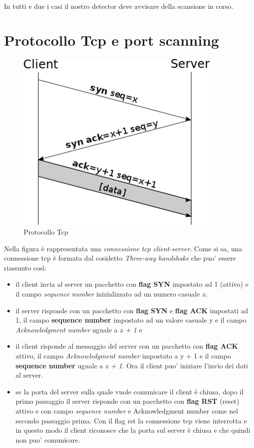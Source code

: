 \documentclass[a4paper,12pt]{article} %
\begin{document}
In tutti e due i casi il nostro detector deve avvisare della scansione in corso.




\section{Protocollo Tcp e port scanning}

\begin{figure}[htbp]
\centering
\includegraphics[width=10cm]{tcp.png}
\caption{\label{Protocollo tcp} Protocollo Tcp}
\end{figure}



Nella figura è rappresentata una \emph{connessione tcp} \emph{client-server}. Come si sa, una connessione tcp è formata dal cosidetto
\emph{Three-way handshake} che puo' essere riassunto così:

\begin{itemize}

\item il client invia al server un pacchetto con \textbf{flag SYN} impostato ad 1 (attivo) e il campo \emph{sequence number}
inizializzato ad un numero casuale \emph{x}.


\item il server risponde con un pacchetto con \textbf{flag SYN} e \textbf{flag ACK} impostati ad 1, il campo \textbf{sequence number}
impostato ad un valore casuale y e il campo \emph{Acknowledgment number} uguale a \emph{x + 1} e 

\item il client risponde al messaggio del server con un pacchetto con \textbf{flag ACK} attivo, il campo \emph{Acknowledgment number} impostato a y + 1 e il campo \textbf{sequence number} uguale a \emph{x + 1}. Ora il client puo' iniziare
l'invio dei dati al server.


\item se la porta del server sulla quale vuole comunicare il client è chiusa, dopo il primo passaggio il server risponde con un pacchetto con \textbf{flag RST} (reset) attivo e con campo \emph{sequence number} e {Acknowledgment number} come nel secondo passaggio prima. Con il flag rst la connessione tcp viene interrotta e in questo modo il client riconosce che la porta sul server è chiusa e che quindi non puo' comunicare.


\end{itemize}
\end{document}
